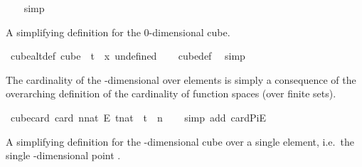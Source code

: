 \begin{isabellebody}
\ \ \isamarkupfalse%
\ simp%
\endisatagproof
{\isafoldproof}%
%
\isadelimproof
%
\endisadelimproof
%
\begin{isamarkuptext}%
A simplifying definition for the 0-dimensional cube.%
\end{isamarkuptext}\isamarkuptrue%
\isamarkupfalse%
\ cube{}{\isacharunderscore}{\kern0pt}alt{\isacharunderscore}{\kern0pt}def{\isacharcolon}{\kern0pt}\ {\isachardoublequoteopen}cube\ {}\ t\ {\isacharequal}{\kern0pt}\ {\isacharbraceleft}{\kern0pt}{\isasymlambda}x{\isachardot}{\kern0pt}\ undefined{\isacharbraceright}{\kern0pt}{\isachardoublequoteclose}\isanewline
%
\isadelimproof
\ \ %
\endisadelimproof
%
\isatagproof
{}\isamarkupfalse%
\ cube{\isacharunderscore}{\kern0pt}def\ \isamarkupfalse%
\ simp%
\endisatagproof
{\isafoldproof}%
%
\isadelimproof
%
\endisadelimproof
%
\begin{isamarkuptext}%
The cardinality of the -dimensional over  elements is simply a consequence of the overarching 
definition of the cardinality of function spaces (over finite sets).%
\end{isamarkuptext}\isamarkuptrue%
\isamarkupfalse%
\ cube{\isacharunderscore}{\kern0pt}card{\isacharcolon}{\kern0pt}\ {\isachardoublequoteopen}card\ {\isacharparenleft}{\kern0pt}{\isacharbraceleft}{\kern0pt}{\isachardot}{\kern0pt}{\isachardot}{\kern0pt}{\isacharless}{\kern0pt}n{\isacharcolon}{\kern0pt}{\isacharcolon}{\kern0pt}nat{\isacharbraceright}{\kern0pt}\ {\isasymrightarrow}\isactrlsub E\ {\isacharbraceleft}{\kern0pt}{\isachardot}{\kern0pt}{\isachardot}{\kern0pt}{\isacharless}{\kern0pt}t{\isacharcolon}{\kern0pt}{\isacharcolon}{\kern0pt}nat{\isacharbraceright}{\kern0pt}{\isacharparenright}{\kern0pt}\ {\isacharequal}{\kern0pt}\ t\ {\isacharcircum}{\kern0pt}\ n{\isachardoublequoteclose}\isanewline
%
\isadelimproof
\ \ %
\endisadelimproof
%
\isatagproof
{}\isamarkupfalse%
\ {\isacharparenleft}{\kern0pt}simp\ add{\isacharcolon}{\kern0pt}\ card{\isacharunderscore}{\kern0pt}PiE{\isacharparenright}{\kern0pt}%
\endisatagproof
{\isafoldproof}%
%
\isadelimproof
%
\endisadelimproof
%
\begin{isamarkuptext}%
A simplifying definition for the -dimensional cube over 
a single element, i.e.\ the single -dimensional point .%
\end{isamarkuptext}\isamarkuptrue%

\end{isabellebody}
